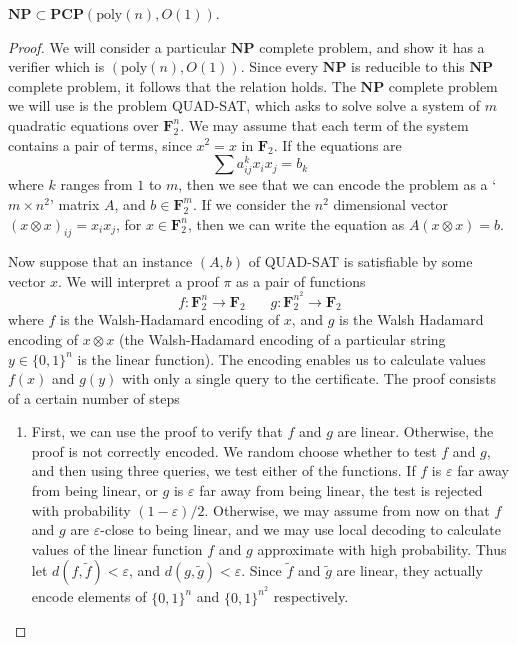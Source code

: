 \begin{theorem}
    $\mathbf{NP} \subset \mathbf{PCP}(\text{poly}(n), O(1))$.
\end{theorem}
\begin{proof}
    We will consider a particular $\mathbf{NP}$ complete problem, and show it has a verifier which is $(\text{poly}(n), O(1))$. Since every $\mathbf{NP}$ is reducible to this $\mathbf{NP}$ complete problem, it follows that the relation holds. The $\mathbf{NP}$ complete problem we will use is the problem QUAD-SAT, which asks to solve solve a system of $m$ quadratic equations over $\mathbf{F}_2^n$. We may assume that each term of the system contains a pair of terms, since $x^2 = x$ in $\mathbf{F}_2$. If the equations are
    \[ \sum a^k_{ij} x_ix_j = b_k \]
    where $k$ ranges from $1$ to $m$, then we see that we can encode the problem as a `$m \times n^2$' matrix $A$, and $b \in \mathbf{F}_2^m$. If we consider the $n^2$ dimensional vector $(x \otimes x)_{ij} = x_i x_j$, for $x \in \mathbf{F}_2^n$, then we can write the equation as $A(x \otimes x) = b$.

    Now suppose that an instance $(A,b)$ of QUAD-SAT is satisfiable by some vector $x$. We will interpret a proof $\pi$ as a pair of functions
    \[ f: \mathbf{F}_2^n \to \mathbf{F}_2\ \ \ \ \ \ \ \ g: \mathbf{F}_2^{n^2} \to \mathbf{F}_2 \]
    where $f$ is the Walsh-Hadamard encoding of $x$, and $g$ is the Walsh Hadamard encoding of $x \otimes x$ (the Walsh-Hadamard encoding of a particular string $y \in \{ 0, 1 \}^n$ is the linear function). The encoding enables us to calculate values $f(x)$ and $g(y)$ with only a single query to the certificate. The proof consists of a certain number of steps

    \begin{enumerate}
        \item First, we can use the proof to verify that $f$ and $g$ are linear. Otherwise, the proof is not correctly encoded. We random choose whether to test $f$ and $g$, and then using three queries, we test either of the functions. If $f$ is $\varepsilon$ far away from being linear, or $g$ is $\varepsilon$ far away from being linear, the test is rejected with probability $(1 - \varepsilon)/2$. Otherwise, we may assume from now on that $f$ and $g$ are $\varepsilon$-close to being linear, and we may use local decoding to calculate values of the linear function $f$ and $g$ approximate with high probability. Thus let $d(f,\tilde{f}) < \varepsilon$, and $d(g,\tilde{g}) < \varepsilon$. Since $\tilde{f}$ and $\tilde{g}$ are linear, they actually encode elements of $\{ 0,1 \}^n$ and $\{ 0, 1  \}^{n^2}$ respectively.


\end{enumerate}
\end{proof}
